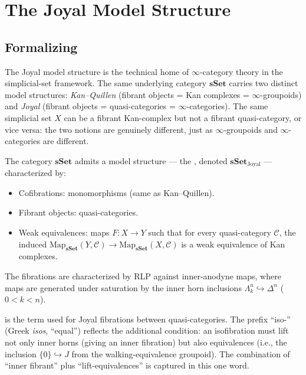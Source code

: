 \section{The Joyal Model Structure}
\label{sec:joyal-model}

\subsection{Formalizing}

\begin{readernote}
The Joyal model structure is the technical home of $\infty$-category
theory in the simplicial-set framework. The same underlying category
$\mathbf{sSet}$ carries two distinct model structures: \emph{Kan--Quillen}
(fibrant objects = Kan complexes = $\infty$-groupoids) and \emph{Joyal}
(fibrant objects = quasi-categories = $\infty$-categories). The same
simplicial set $X$ can be a fibrant Kan-complex but not a fibrant
quasi-category, or vice versa: the two notions are genuinely different,
just as $\infty$-groupoids and $\infty$-categories are different.
\end{readernote}

\begin{theorem}
\label{thm:joyal-model}
The category $\mathbf{sSet}$ admits a model structure — the , denoted $\mathbf{sSet}_{\mathrm{Joyal}}$ — characterized
by:
\begin{itemize}
  \item Cofibrations: monomorphisms (same as Kan–Quillen).
  \item Fibrant objects: quasi-categories.
  \item Weak equivalences: maps $F : X \to Y$ such that for every
        quasi-category $\mathcal{C}$, the induced
        $\mathrm{Map}_{\mathbf{sSet}}(Y, \mathcal{C}) \to
        \mathrm{Map}_{\mathbf{sSet}}(X, \mathcal{C})$ is a weak
        equivalence of Kan complexes.
\end{itemize}
The fibrations are characterized by RLP against inner-anodyne maps,
where  maps are generated under saturation by the
inner horn inclusions $\Lambda^n_k \hookrightarrow \Delta^n$ ($0 < k < n$).
\end{theorem}

\begin{nameorigin}
 is the term used for Joyal fibrations between
quasi-categories. The prefix ``iso-'' (Greek \emph{isos}, ``equal'')
reflects the additional condition: an isofibration must lift not only
inner horns (giving an inner fibration) but also equivalences (i.e.,
the inclusion $\{0\} \hookrightarrow J$ from the walking-equivalence
groupoid). The combination of ``inner fibrant'' plus ``lift-equivalences''
is captured in this one word.
\end{nameorigin}

